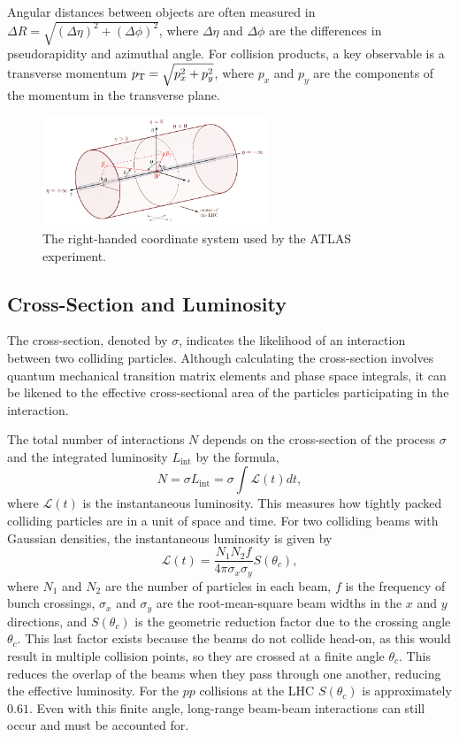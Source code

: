 Angular distances between objects are often measured in $\Delta R = \sqrt{(\Delta \eta)^2 + (\Delta \phi)^2}$, where $\Delta \eta$ and $\Delta \phi$ are the differences in pseudorapidity and azimuthal angle.
For collision products, a key observable is a transverse momentum $p_\mathrm{T}=\sqrt{p_x^2 + p_y^2}$, where $p_x$ and $p_y$ are the components of the momentum in the transverse plane.

\begin{figure}
    \centering
    \includegraphics[width=0.6\textwidth]{Feynman/coordinate.pdf}
    \caption{The right-handed coordinate system used by the ATLAS experiment.}
    \label{fig:atlas_coordinate_system}
\end{figure}

\subsection{Cross-Section and Luminosity}

The cross-section, denoted by $\sigma$, indicates the likelihood of an interaction between two colliding particles.
Although calculating the cross-section involves quantum mechanical transition matrix elements and phase space integrals, it can be likened to the effective cross-sectional area of the particles participating in the interaction.

The total number of interactions $N$ depends on the cross-section of the process $\sigma$ and the integrated luminosity $L_{\text{int}}$ by the formula,
\begin{equation}
    N = \sigma L_{\text{int}} = \sigma \int \mathcal{L}(t) dt,
\end{equation}
where $\mathcal{L}(t)$ is the instantaneous luminosity.
This measures how tightly packed colliding particles are in a unit of space and time.
For two colliding beams with Gaussian densities, the instantaneous luminosity is given by
\begin{equation}
    \mathcal{L}(t) = \frac{N_1 N_2 f}{4 \pi \sigma_x \sigma_y} S(\theta_c),
\end{equation}
where $N_1$ and $N_2$ are the number of particles in each beam, $f$ is the frequency of bunch crossings, $\sigma_x$ and $\sigma_y$ are the root-mean-square beam widths in the $x$ and $y$ directions, and $S(\theta_c)$ is the geometric reduction factor due to the crossing angle $\theta_c$.
This last factor exists because the beams do not collide head-on, as this would result in multiple collision points, so they are crossed at a finite angle $\theta_c$.
This reduces the overlap of the beams when they pass through one another, reducing the effective luminosity.
For the $pp$ collisions at the LHC $S(\theta_c)$ is approximately $0.61$.
Even with this finite angle, long-range beam-beam interactions can still occur and must be accounted for.

